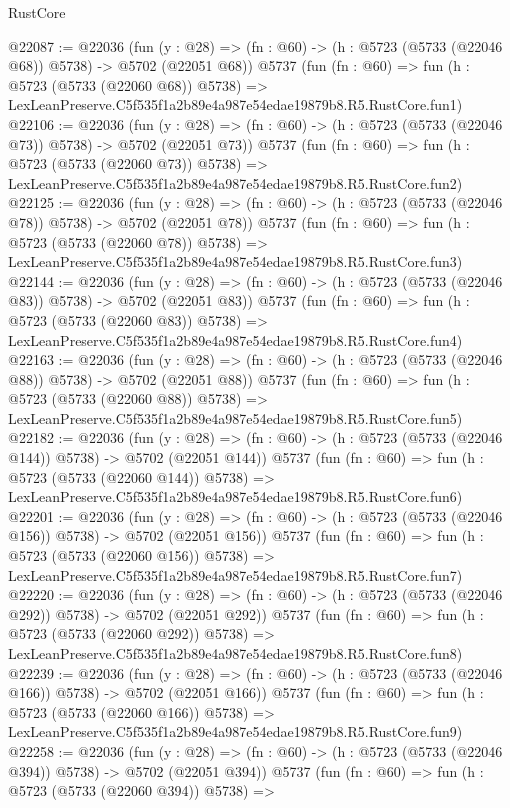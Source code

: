 \begin{lexlean}{RustCore}
\begin{coremodule}
@22087 := @22036
    (fun (y : @28) => (fn : @60) -> (h : @5723 (@5733 (@22046 @68)) @5738) -> @5702 (@22051 @68))
    @5737
    (fun (fn : @60) =>
    fun (h : @5723 (@5733 (@22060 @68)) @5738) =>
    LexLeanPreserve.C5f535f1a2b89e4a987e54edae19879b8.R5.RustCore.fun1)
@22106 := @22036
    (fun (y : @28) => (fn : @60) -> (h : @5723 (@5733 (@22046 @73)) @5738) -> @5702 (@22051 @73))
    @5737
    (fun (fn : @60) =>
    fun (h : @5723 (@5733 (@22060 @73)) @5738) =>
    LexLeanPreserve.C5f535f1a2b89e4a987e54edae19879b8.R5.RustCore.fun2)
@22125 := @22036
    (fun (y : @28) => (fn : @60) -> (h : @5723 (@5733 (@22046 @78)) @5738) -> @5702 (@22051 @78))
    @5737
    (fun (fn : @60) =>
    fun (h : @5723 (@5733 (@22060 @78)) @5738) =>
    LexLeanPreserve.C5f535f1a2b89e4a987e54edae19879b8.R5.RustCore.fun3)
@22144 := @22036
    (fun (y : @28) => (fn : @60) -> (h : @5723 (@5733 (@22046 @83)) @5738) -> @5702 (@22051 @83))
    @5737
    (fun (fn : @60) =>
    fun (h : @5723 (@5733 (@22060 @83)) @5738) =>
    LexLeanPreserve.C5f535f1a2b89e4a987e54edae19879b8.R5.RustCore.fun4)
@22163 := @22036
    (fun (y : @28) => (fn : @60) -> (h : @5723 (@5733 (@22046 @88)) @5738) -> @5702 (@22051 @88))
    @5737
    (fun (fn : @60) =>
    fun (h : @5723 (@5733 (@22060 @88)) @5738) =>
    LexLeanPreserve.C5f535f1a2b89e4a987e54edae19879b8.R5.RustCore.fun5)
@22182 := @22036
    (fun (y : @28) => (fn : @60) -> (h : @5723 (@5733 (@22046 @144)) @5738) -> @5702 (@22051 @144))
    @5737
    (fun (fn : @60) =>
    fun (h : @5723 (@5733 (@22060 @144)) @5738) =>
    LexLeanPreserve.C5f535f1a2b89e4a987e54edae19879b8.R5.RustCore.fun6)
@22201 := @22036
    (fun (y : @28) => (fn : @60) -> (h : @5723 (@5733 (@22046 @156)) @5738) -> @5702 (@22051 @156))
    @5737
    (fun (fn : @60) =>
    fun (h : @5723 (@5733 (@22060 @156)) @5738) =>
    LexLeanPreserve.C5f535f1a2b89e4a987e54edae19879b8.R5.RustCore.fun7)
@22220 := @22036
    (fun (y : @28) => (fn : @60) -> (h : @5723 (@5733 (@22046 @292)) @5738) -> @5702 (@22051 @292))
    @5737
    (fun (fn : @60) =>
    fun (h : @5723 (@5733 (@22060 @292)) @5738) =>
    LexLeanPreserve.C5f535f1a2b89e4a987e54edae19879b8.R5.RustCore.fun8)
@22239 := @22036
    (fun (y : @28) => (fn : @60) -> (h : @5723 (@5733 (@22046 @166)) @5738) -> @5702 (@22051 @166))
    @5737
    (fun (fn : @60) =>
    fun (h : @5723 (@5733 (@22060 @166)) @5738) =>
    LexLeanPreserve.C5f535f1a2b89e4a987e54edae19879b8.R5.RustCore.fun9)
@22258 := @22036
    (fun (y : @28) => (fn : @60) -> (h : @5723 (@5733 (@22046 @394)) @5738) -> @5702 (@22051 @394))
    @5737
    (fun (fn : @60) =>
    fun (h : @5723 (@5733 (@22060 @394)) @5738) =>

\end{coremodule}
\end{lexlean}
